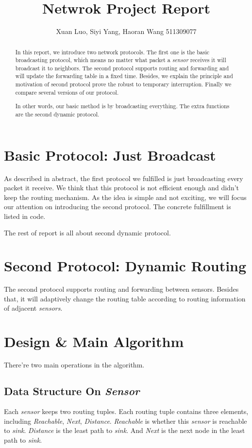 \documentclass[a4paper]{article}
\begin{document}
\title{Netwrok Project Report}

\author{Xuan Luo, Siyi Yang, Haoran Wang 511309077}

\maketitle

\begin{abstract}
In this report, we introduce two network protocols. The first one is the basic broadcasting protocol, which means no matter what packet a \emph{sensor} receives it will broadcast it to neighbors. The second protocol supports routing and forwarding and will update the forwarding table in a fixed time. Besides, we explain the principle and motivation of second protocol prove the robust to temporary interruption. Finally we compare several versions of our protocol.

In other words, our basic method is by broadcasting everything. The extra functions are the second dynamic protocol.
\end{abstract}

\section{Basic Protocol: Just Broadcast}
As described in abstract, the first protocol we fulfilled is just broadcasting every packet it receive. We think that this protocol is not efficient enough and didn't keep the routing mechanism. As the idea is simple and not exciting, we will focus our attention on introducing the second protocol. The concrete fulfillment is listed in code.

The rest of report is all about second dynamic protocol.

\section{Second Protocol: Dynamic Routing}
The second protocol supports routing and forwarding between sensors. Besides that, it will adaptively change the routing table according to routing information of adjacent \emph{sensors}.


\section{Design \& Main Algorithm}
There're two main operations in the algorithm.
\subsection{Data Structure On \emph{Sensor}}
Each \emph{sensor} keeps two routing tuples. Each routing tuple contains three elements, including  \emph{Reachable}, \emph{Next}, \emph{Distance}. \emph{Reachable} is whether this \emph{sensor} is reachable to \emph{sink}. \emph{Distance} is the least path to \emph{sink}. And \emph{Next} is the next node in the least path to \emph{sink}.
\end{document}
